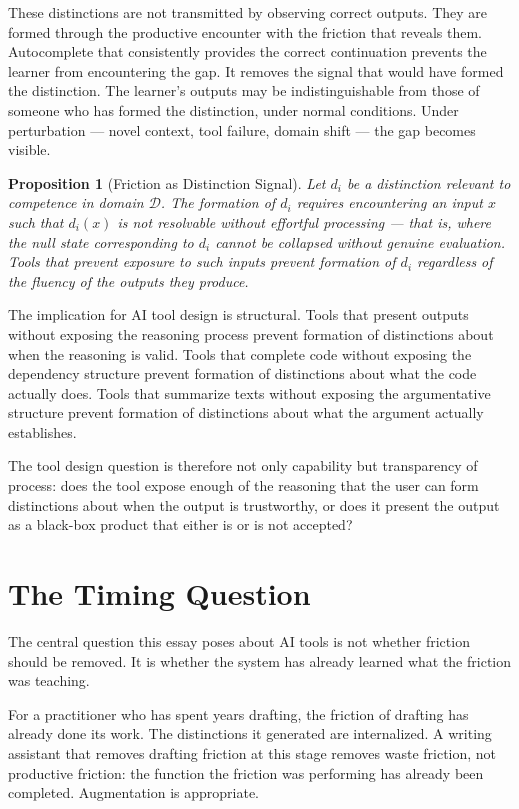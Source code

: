 \documentclass[11pt]{article}
\newtheorem{proposition}{Proposition}
\theoremstyle{remark}
\begin{document}
These distinctions are not transmitted by observing correct outputs. They are formed through the productive encounter with the friction that reveals them. Autocomplete that consistently provides the correct continuation prevents the learner from encountering the gap. It removes the signal that would have formed the distinction. The learner's outputs may be indistinguishable from those of someone who has formed the distinction, under normal conditions. Under perturbation --- novel context, tool failure, domain shift --- the gap becomes visible.

\begin{proposition}[Friction as Distinction Signal]
\label{prop:distinction_signal}
Let $d_i$ be a distinction relevant to competence in domain $\mathcal{D}$. The formation of $d_i$ requires encountering an input $x$ such that $d_i(x)$ is not resolvable without effortful processing --- that is, where the null state corresponding to $d_i$ cannot be collapsed without genuine evaluation. Tools that prevent exposure to such inputs prevent formation of $d_i$ regardless of the fluency of the outputs they produce.
\end{proposition}

The implication for AI tool design is structural. Tools that present outputs without exposing the reasoning process prevent formation of distinctions about when the reasoning is valid. Tools that complete code without exposing the dependency structure prevent formation of distinctions about what the code actually does. Tools that summarize texts without exposing the argumentative structure prevent formation of distinctions about what the argument actually establishes.

The tool design question is therefore not only capability but transparency of process: does the tool expose enough of the reasoning that the user can form distinctions about when the output is trustworthy, or does it present the output as a black-box product that either is or is not accepted?

\section{The Timing Question}
\label{sec:timing}

The central question this essay poses about AI tools is not whether friction should be removed. It is whether the system has already learned what the friction was teaching.

For a practitioner who has spent years drafting, the friction of drafting has already done its work. The distinctions it generated are internalized. A writing assistant that removes drafting friction at this stage removes waste friction, not productive friction: the function the friction was performing has already been completed. Augmentation is appropriate.
\end{document}
